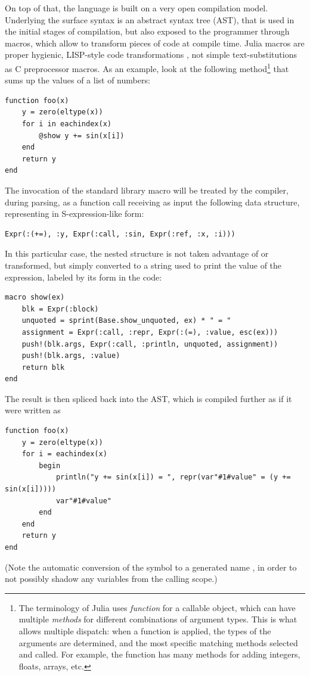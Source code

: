 On top of that, the language is built on a very open compilation model.  Underlying the surface
syntax is an abstract syntax tree (AST), that is used in the initial stages of compilation, but also
exposed to the programmer through macros, which allow to transform pieces of code at compile time.
Julia macros are proper hygienic, LISP-style code transformations \parencite[cf.][]{hoyte2008let},
not simple text-substitutions as C preprocessor macros.  As an example, look at the following
method\footnote{The terminology of Julia uses \emph{function} for a callable object, which can have
  multiple \emph{methods} for different combinations of argument types.  This is what allows
  multiple dispatch: when a function is applied, the types of the arguments are determined, and the
  most specific matching methods selected and called.  For example, the \protect\jlinl{+} function
  has many methods for adding integers, floats, arrays, etc.}  that sums up the  values
of a list of numbers:
\begin{lstlisting}
function foo(x)
    y = zero(eltype(x))
    for i in eachindex(x)
        @show y += sin(x[i])
    end
    return y
end
\end{lstlisting}
The invocation of the standard library macro  will be treated by the compiler, during
parsing, as a function call receiving as input the following data structure, representing  in S-expression-like form:
\begin{lstlisting}
Expr(:(+=), :y, Expr(:call, :sin, Expr(:ref, :x, :i)))
\end{lstlisting}
In this particular case, the nested structure is not taken advantage of or transformed, but simply
converted to a string used to print the value of the expression, labeled by its form in the code:
\begin{lstlisting}
macro show(ex)
    blk = Expr(:block)
    unquoted = sprint(Base.show_unquoted, ex) * " = "
    assignment = Expr(:call, :repr, Expr(:(=), :value, esc(ex)))
    push!(blk.args, Expr(:call, :println, unquoted, assignment))
    push!(blk.args, :value)
    return blk
end
\end{lstlisting}
The result is then spliced back into the AST, which is compiled further as if it were written as
\begin{lstlisting}
function foo(x)
    y = zero(eltype(x))
    for i = eachindex(x)
        begin
            println("y += sin(x[i]) = ", repr(var"#1#value" = (y += sin(x[i]))))
            var"#1#value"
        end
    end
    return y
end
\end{lstlisting}
(Note the automatic conversion of the symbol  to a generated name , in
order to not possibly shadow any variables from the calling scope.)


